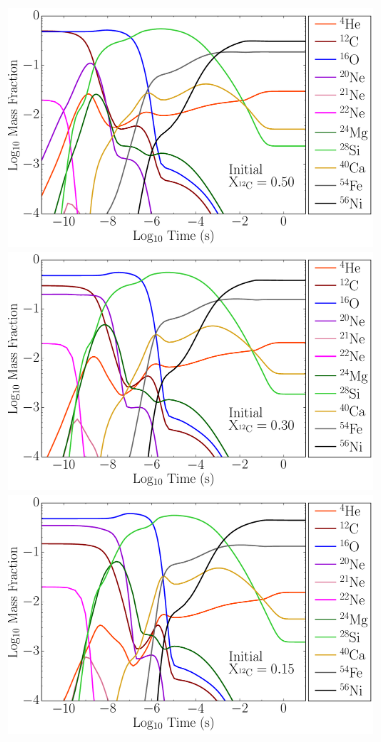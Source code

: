 \documentclass[iop,apj]{emulateapj}
\begin{document}
\begin{figure}[t]
	\begin{minipage}{0.5\textwidth}
		\includegraphics[width=0.86\textwidth]{figures/detonation_plotfiles/XvsT_wn_0_XC-50.pdf}
	\end{minipage}	
	\hfill
	\begin{minipage}{0.5\textwidth}
		\includegraphics[width=0.86\textwidth]{figures/detonation_plotfiles/XvsT_wn_20_XC-30.pdf}
	\end{minipage}
	\hfill
	\begin{minipage}{0.5\textwidth}
		\includegraphics[width=0.86\textwidth]{figures/detonation_plotfiles/XvsT_wn_35_XC-15.pdf}

\end{minipage}
\end{figure}
\end{document}
